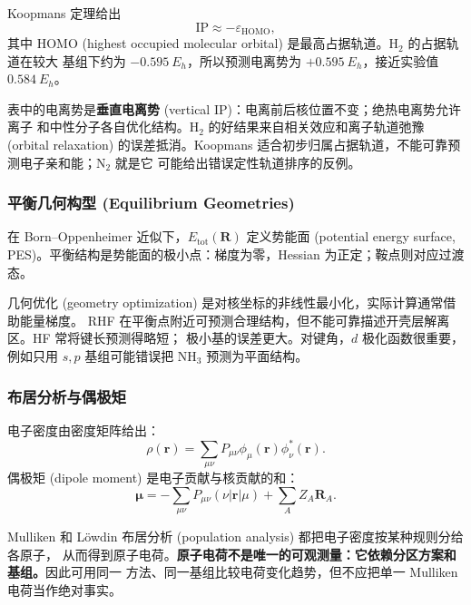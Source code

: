 \documentclass[fontset=none,12pt,a4paper]{ctexart}
\numberwithin{equation}{section}
\begin{document}
Koopmans 定理给出
\[
  \mathrm{IP}\approx-\varepsilon_{\mathrm{HOMO}},
\]
其中 HOMO (highest occupied molecular orbital) 是最高占据轨道。$\mathrm{H_2}$ 的占据轨道在较大
基组下约为 $-0.595\ E_h$，所以预测电离势为 $+0.595\ E_h$，接近实验值 $0.584\ E_h$。

表中的电离势是\textbf{垂直电离势} (vertical IP)：电离前后核位置不变；绝热电离势允许离子
和中性分子各自优化结构。$\mathrm{H_2}$ 的好结果来自相关效应和离子轨道弛豫 (orbital relaxation)
的误差抵消。Koopmans 适合初步归属占据轨道，不能可靠预测电子亲和能；$\mathrm{N_2}$ 就是它
可能给出错误定性轨道排序的反例。

\subsubsection{平衡几何构型 (Equilibrium Geometries)}

在 Born--Oppenheimer 近似下，$E_{\mathrm{tot}}(\mathbf R)$ 定义势能面 (potential energy
surface, PES)。平衡结构是势能面的极小点：梯度为零，Hessian 为正定；鞍点则对应过渡态。

几何优化 (geometry optimization) 是对核坐标的非线性最小化，实际计算通常借助能量梯度。
RHF 在平衡点附近可预测合理结构，但不能可靠描述开壳层解离区。HF 常将键长预测得略短；
极小基的误差更大。对键角，$d$ 极化函数很重要，例如只用 $s,p$ 基组可能错误把 $\mathrm{NH_3}$
预测为平面结构。

\subsubsection{布居分析与偶极矩}

电子密度由密度矩阵给出：
\[
  \rho(\mathbf r)=\sum_{\mu\nu}P_{\mu\nu}
  \phi_\mu(\mathbf r)\phi_\nu^*(\mathbf r).
\]
偶极矩 (dipole moment) 是电子贡献与核贡献的和：
\[
  \boldsymbol\mu=-\sum_{\mu\nu}P_{\mu\nu}(\nu|\mathbf r|\mu)
  +\sum_AZ_A\mathbf R_A.
\]

Mulliken 和 L\"owdin 布居分析 (population analysis) 都把电子密度按某种规则分给各原子，
从而得到原子电荷。\textbf{原子电荷不是唯一的可观测量：它依赖分区方案和基组。}因此可用同一
方法、同一基组比较电荷变化趋势，但不应把单一 Mulliken 电荷当作绝对事实。
\end{document}
